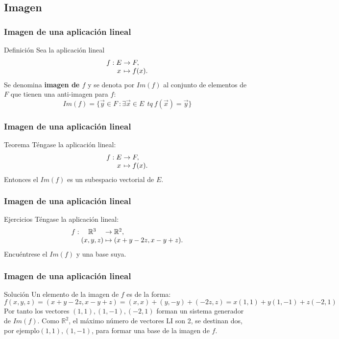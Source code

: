 \documentclass{beamer}
\begin{document}
\subsection{Imagen}


\begin{frame}
  \frametitle{Imagen de una aplicaci\'on lineal}
 \begin{block}{Definici\'on} 
Sea la aplicaci\'on lineal\[
  \begin{array}{@{}r@{\;}c@{\;}c@{\;}l@{}}
    f: & E & \rightarrow & F,   \\
       & x & \mapsto     & f(x).
  \end{array}
\] 
Se denomina \textbf{imagen de $f$} y se denota por $Im(f)$ al conjunto de elementos de $F$ que tienen una anti-imagen para $f$:
\[Im(f) = \{\vec y\in F\ : \exists \vec x \in E\ \ tq \ f(\vec x) = \vec y\}\]
\end{block} 
 \end{frame}

\begin{frame}
  \frametitle{Imagen de una aplicaci\'on lineal}
 \begin{block}{Teorema} 
T\'engase la aplicaci\'on lineal:\[
  \begin{array}{@{}r@{\;}c@{\;}c@{\;}l@{}}
    f: & E & \rightarrow & F,   \\
       & x & \mapsto     & f(x).
  \end{array}
\] 
Entonces el $Im(f)$ es un subespacio vectorial de $E$.
\end{block} 
 \end{frame}
 



\begin{frame}
  \frametitle{Imagen de una aplicaci\'on lineal}
 \begin{block}{Ejercicios} 
T\'engase la aplicaci\'on lineal: \[
  \begin{array}{@{}r@{\;}c@{\;}c@{\;}l@{}}
    f: & \mathbb R^3 & \rightarrow & \mathbb R^2,   \\
       & (x,y,z) & \mapsto     & (x+y-2z, x-y+z).
  \end{array}
\] 
Encu\'entrese el $Im(f)$ y una base suya.
\end{block} 
 \end{frame}


 \begin{frame}
  \frametitle{Imagen de una aplicaci\'on lineal}
 \begin{block}{Soluci\'on} 
Un elemento de la imagen de $f$ es de la forma:
 \[ f(x,y,z) = (x+y-2z, x-y+z)=(x,x)+(y,-y)+(-2z,z) = x(1,1)+y(1,-1)+z(-2,1)\] 
Por tanto los vectores $(1,1), (1,-1), (-2,1)$ forman un sistema generador de $Im(f)$. Como $\mathbb R^2$, el m\'aximo n\'umero de vectores LI son 2, se destinan dos, por ejemplo$(1,1),(1,-1)$, para formar una base de la imagen de $f$.
\end{block} 
 \end{frame}
\end{document}
